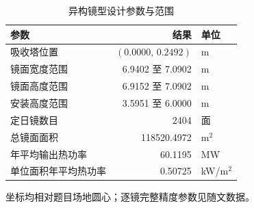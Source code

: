\begin{table}[H]
\centering\small
\caption{异构镜型设计参数与范围}\label{tab:q3design}
\begin{tabular}{lrl}
\toprule
参数 & 结果 & 单位\\\midrule
吸收塔位置 & $(0.0000,\,0.2492)$ & m\\
镜面宽度范围 & 6.9402 至 7.0902 & m\\
镜面高度范围 & 6.9152 至 7.0902 & m\\
安装高度范围 & 3.5951 至 6.0000 & m\\
定日镜数目 & 2404 & 面\\
总镜面面积 & 118520.4972 & m$^2$\\
年平均输出热功率 & 60.1195 & MW\\
单位面积年平均热功率 & 0.50725 & kW/m$^2$\\
\bottomrule
\end{tabular}
\par\vspace{3pt}\begin{minipage}{.95\linewidth}\footnotesize 坐标均相对题目场地圆心；逐镜完整精度参数见随文数据。\end{minipage}
\end{table}
